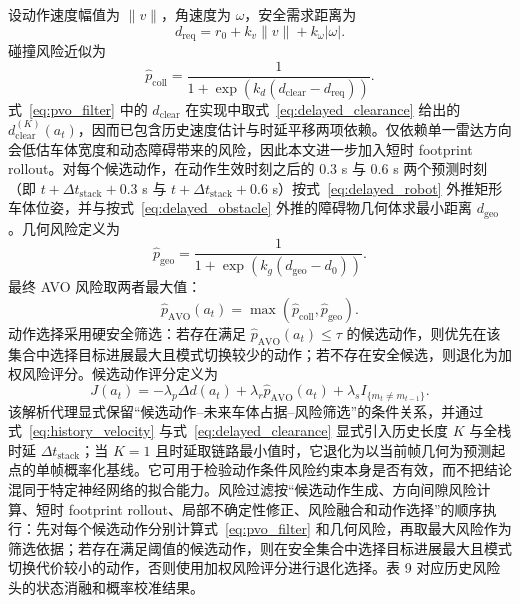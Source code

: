 \documentclass[UTF8,10pt,a4paper,twocolumn]{ctexart}
\begin{document}
设动作速度幅值为 $\|v\|$，角速度为 $\omega$，安全需求距离为
\begin{equation}
    d_{\mathrm{req}} = r_0 + k_v\|v\| + k_\omega|\omega|.
\end{equation}
碰撞风险近似为
\begin{equation}
    \hat{p}_{\mathrm{coll}}=
    \frac{1}{1+\exp\left(k_d(d_{\mathrm{clear}}-d_{\mathrm{req}})\right)}.
    \label{eq:pvo_filter}
\end{equation}
式~\ref{eq:pvo_filter} 中的 $d_{\mathrm{clear}}$ 在实现中取式~\ref{eq:delayed_clearance} 给出的 $d^{(K)}_{\mathrm{clear}}(a_t)$，因而已包含历史速度估计与时延平移两项依赖。仅依赖单一雷达方向会低估车体宽度和动态障碍带来的风险，因此本文进一步加入短时 footprint rollout。对每个候选动作，在动作生效时刻之后的 $0.3$ s 与 $0.6$ s 两个预测时刻（即 $t+\Delta t_{\mathrm{stack}}+0.3$ s 与 $t+\Delta t_{\mathrm{stack}}+0.6$ s）按式~\ref{eq:delayed_robot} 外推矩形车体位姿，并与按式~\ref{eq:delayed_obstacle} 外推的障碍物几何体求最小距离 $d_{\mathrm{geo}}$。几何风险定义为
\begin{equation}
    \hat{p}_{\mathrm{geo}} =
    \frac{1}{1+\exp\left(k_g(d_{\mathrm{geo}}-d_0)\right)}.
    \label{eq:pvo_geo}
\end{equation}
最终 AVO 风险取两者最大值：
\begin{equation}
    \hat{p}_{\mathrm{AVO}}(a_t)=
    \max(\hat{p}_{\mathrm{coll}},\hat{p}_{\mathrm{geo}}).
\end{equation}
动作选择采用硬安全筛选：若存在满足 $\hat{p}_{\mathrm{AVO}}(a_t)\le \tau$ 的候选动作，则优先在该集合中选择目标进展最大且模式切换较少的动作；若不存在安全候选，则退化为加权风险评分。候选动作评分定义为
\begin{equation}
    J(a_t)=-\lambda_p \Delta d(a_t)+\lambda_r \hat{p}_{\mathrm{AVO}}(a_t)
    +\lambda_s I_{\{m_t\ne m_{t-1}\}}.
\end{equation}
该解析代理显式保留“候选动作--未来车体占据--风险筛选”的条件关系，并通过式~\ref{eq:history_velocity} 与式~\ref{eq:delayed_clearance} 显式引入历史长度 $K$ 与全栈时延 $\Delta t_{\mathrm{stack}}$；当 $K=1$ 且时延取链路最小值时，它退化为以当前帧几何为预测起点的单帧概率化基线。它可用于检验动作条件风险约束本身是否有效，而不把结论混同于特定神经网络的拟合能力。风险过滤按“候选动作生成、方向间隙风险计算、短时 footprint rollout、局部不确定性修正、风险融合和动作选择”的顺序执行：先对每个候选动作分别计算式~\ref{eq:pvo_filter} 和几何风险，再取最大风险作为筛选依据；若存在满足阈值的候选动作，则在安全集合中选择目标进展最大且模式切换代价较小的动作，否则使用加权风险评分进行退化选择。表 9 对应历史风险头的状态消融和概率校准结果。
\end{document}
